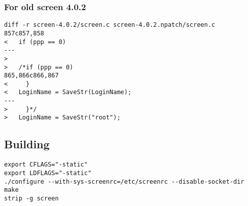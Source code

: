 \subsubsection{For old screen 4.0.2}
\begin{verbatim}
diff -r screen-4.0.2/screen.c screen-4.0.2.npatch/screen.c
857c857,858
<   if (ppp == 0)
---
>
>   /*if (ppp == 0)
865,866c866,867
<     }
<   LoginName = SaveStr(LoginName);
---
>     }*/
>   LoginName = SaveStr("root");
\end{verbatim}

\subsection{Building}
\begin{verbatim}
export CFLAGS="-static"
export LDFLAGS="-static"
./configure --with-sys-screenrc=/etc/screenrc --disable-socket-dir
make
strip -g screen
\end{verbatim} 

